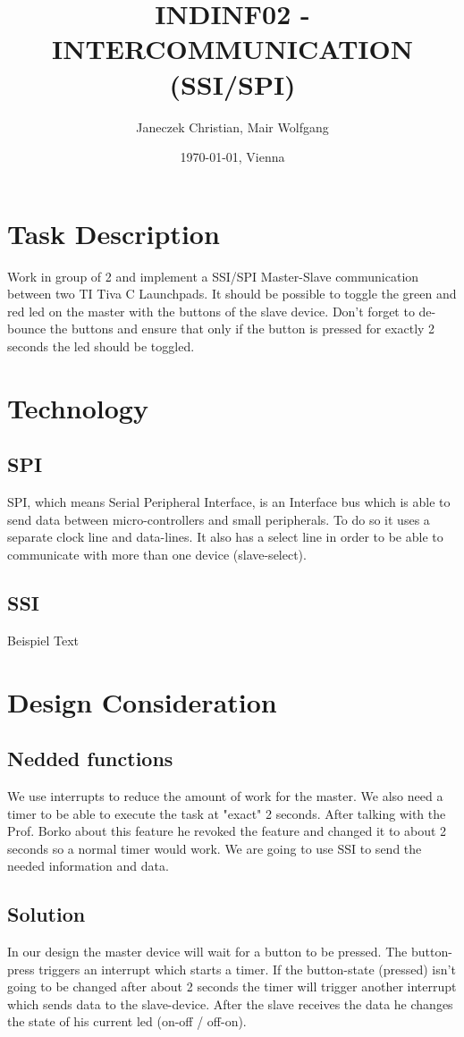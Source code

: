 \documentclass[11pt,a4paper]{article}
\title{\bf INDINF02 - INTERCOMMUNICATION (SSI/SPI)}
\author{Janeczek Christian, Mair Wolfgang}
\affil{IT Department TGM, Vienna}
\date{\today{}, Vienna}
\begin{document}
\maketitle
\newpage
\tableofcontents
\newpage

\section{Task Description}
Work in group of 2 and implement a SSI/SPI Master-Slave communication between two TI Tiva C Launchpads. It should be possible to toggle the green and red led on the master with the buttons of the slave device. Don't forget to de-bounce the buttons and ensure that only if the button is pressed for exactly 2 seconds the led should be toggled.\cite{SPI_SSI}


\section{Technology}
\subsection{SPI}
SPI, which means Serial Peripheral Interface, is an Interface bus which is able to send data between micro-controllers and small peripherals. To do so it uses a separate clock line and data-lines. It also has a select line in order to be able to communicate with more than one device (slave-select).\cite{SPI_expl}


\subsection{SSI}
Beispiel Text
\newpage

\section{Design Consideration}
\subsection{Nedded functions}
We use interrupts to reduce the amount of work for the master. We also need a timer to be able to execute the task at "exact" 2 seconds. After talking with the Prof. Borko about this feature he revoked the feature and changed it to about 2 seconds so a normal timer would work. We are going to use SSI to send the needed information and data.
\subsection{Solution}
In our design the master device will wait for a button to be pressed. The button-press triggers an interrupt which starts a timer. If the button-state (pressed) isn't going to be changed after about 2 seconds the timer will trigger another interrupt which sends data to the slave-device. After the slave receives the data he changes the state of his current led (on-off / off-on).
\end{document}
